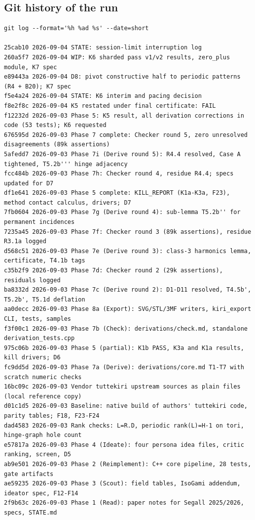 \documentclass[10pt,a4paper]{article}
\begin{document}
\subsection*{Git history of the run}
\begin{lstlisting}
git log --format='%h %ad %s' --date=short

25cab10 2026-09-04 STATE: session-limit interruption log
260a5f7 2026-09-04 WIP: K6 sharded pass v1/v2 results, zero_plus module, K7 spec
e89443a 2026-09-04 D8: pivot constructive half to periodic patterns (R4 + B20); K7 spec
f5e4a24 2026-09-04 STATE: K6 interim and pacing decision
f8e2f8c 2026-09-04 K5 restated under final certificate: FAIL
f12232d 2026-09-03 Phase 5: K5 result, all derivation corrections in code (53 tests); K6 requested
676595d 2026-09-03 Phase 7 complete: Checker round 5, zero unresolved disagreements (89k assertions)
5afedd7 2026-09-03 Phase 7i (Derive round 5): R4.4 resolved, Case A tightened, T5.2b''' hinge adjacency
fcc484b 2026-09-03 Phase 7h: Checker round 4, residue R4.4; specs updated for D7
df1e641 2026-09-03 Phase 5 complete: KILL_REPORT (K1a-K3a, F23), method contact calculus, drivers; D7
7fb0604 2026-09-03 Phase 7g (Derive round 4): sub-lemma T5.2b'' for permanent incidences
7235a45 2026-09-03 Phase 7f: Checker round 3 (89k assertions), residue R3.1a logged
d568c51 2026-09-03 Phase 7e (Derive round 3): class-3 harmonics lemma, certificate, T4.1b tags
c35b2f9 2026-09-03 Phase 7d: Checker round 2 (29k assertions), residuals logged
ba8332d 2026-09-03 Phase 7c (Derive round 2): D1-D11 resolved, T4.5b', T5.2b', T5.1d deflation
aa0decc 2026-09-03 Phase 8a (Export): SVG/STL/3MF writers, kiri_export CLI, tests, samples
f3f00c1 2026-09-03 Phase 7b (Check): derivations/check.md, standalone derivation_tests.cpp
975c06b 2026-09-03 Phase 5 (partial): K1b PASS, K3a and K1a results, kill drivers; D6
fc9dd5d 2026-09-03 Phase 7a (Derive): derivations/core.md T1-T7 with scratch numeric checks
16bc09c 2026-09-03 Vendor tuttekiri upstream sources as plain files (local reference copy)
d01c1d5 2026-09-03 Baseline: native build of authors' tuttekiri code, parity tables; F18, F23-F24
dad4583 2026-09-03 Rank checks: L=R.D, periodic rank(L)=H-1 on tori, hinge-graph hole count
e57817a 2026-09-03 Phase 4 (Ideate): four persona idea files, critic ranking, screen, D5
ab9e501 2026-09-03 Phase 2 (Reimplement): C++ core pipeline, 28 tests, gate artifacts
ae59235 2026-09-03 Phase 3 (Scout): field tables, IsoGami addendum, ideator spec, F12-F14
2f9b63c 2026-09-03 Phase 1 (Read): paper notes for Segall 2025/2026, specs, STATE.md
\end{lstlisting}
\end{document}
